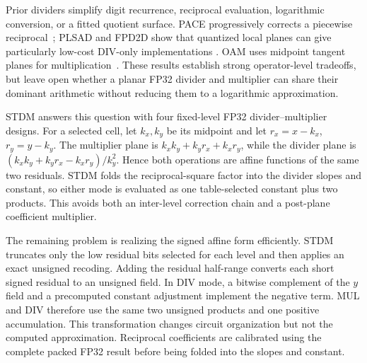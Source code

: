 \documentclass[conference]{IEEEtran}
\begin{document}
Prior dividers simplify digit recurrence, reciprocal evaluation, logarithmic
conversion, or a fitted quotient surface. PACE progressively corrects a
piecewise reciprocal~\cite{wen2025pace}; PLSAD and FPD2D show that quantized
local planes can give particularly low-cost DIV-only implementations
\cite{wu2024plsad,dimeo2025fpd2d}. OAM uses midpoint tangent planes for
multiplication~\cite{chen2020oam}. These results establish strong
operator-level tradeoffs, but leave open whether
a planar FP32 divider and multiplier can share their dominant arithmetic
without reducing them to a logarithmic approximation.

STDM answers this question with four fixed-level FP32 divider--multiplier
designs. For a selected cell, let $k_x,k_y$ be its midpoint and let
$r_x=x-k_x$, $r_y=y-k_y$. The multiplier plane is
$k_xk_y+k_yr_x+k_xr_y$, while the divider plane is
$(k_xk_y+k_yr_x-k_xr_y)/k_y^2$. Hence both operations are affine functions of
the same two residuals. STDM folds the reciprocal-square factor into the
divider slopes and constant, so either mode is evaluated as one table-selected
constant plus two products. This avoids both an inter-level correction chain
and a post-plane coefficient multiplier.

The remaining problem is realizing the signed affine form efficiently. STDM
truncates only the low residual bits selected for each level and then applies
an exact unsigned recoding. Adding the residual half-range converts each short
signed residual to an unsigned field. In DIV mode, a bitwise complement of the
$y$ field and a precomputed constant adjustment implement the negative term.
MUL and DIV therefore use the same two unsigned products and one positive
accumulation. This transformation changes circuit organization but not the
computed approximation. Reciprocal coefficients are calibrated using the
complete packed FP32 result before being folded into the slopes and constant.
\end{document}
